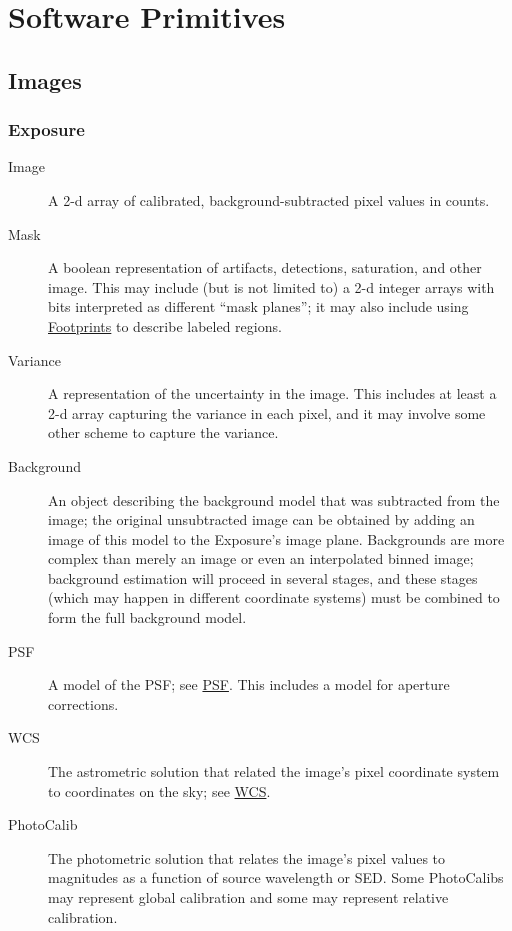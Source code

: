 \section{Software Primitives}
\label{sec:software-primitives}

\subsection{Images}
\label{sec:spImages}

\subsubsection{Exposure}
\label{sec:spImagesExposure}

\begin{description}
\item[Image] A 2-d array of calibrated, background-subtracted pixel values in counts.
\item[Mask] A boolean representation of artifacts, detections, saturation, and other image.  This may include (but is not limited to) a 2-d integer arrays with bits interpreted as different ``mask planes''; it may also include using \hyperref[sec:spFootprints]{Footprints} to describe labeled regions.
\item[Variance] A representation of the uncertainty in the image.  This includes at least a 2-d array capturing the variance in each pixel, and it may involve some other scheme to capture the variance.
\item[Background] An object describing the background model that was subtracted from the image; the original unsubtracted image can be obtained by adding an image of this model to the Exposure's image plane.  Backgrounds are more complex than merely an image or even an interpolated binned image; background estimation will proceed in several stages, and these stages (which may happen in different coordinate systems) must be combined to form the full background model.
\item[PSF] A model of the PSF; see \hyperref[sec:spPSF]{PSF}.  This includes a model for aperture corrections.
\item[WCS] The astrometric solution that related the image's pixel coordinate system to coordinates on the sky; see \hyperref[sec:spWCS]{WCS}.
\item[PhotoCalib] The photometric solution that relates the image's pixel values to magnitudes as a function of source wavelength or SED.  Some PhotoCalibs may represent global calibration and some may represent relative calibration.
\end{description}

